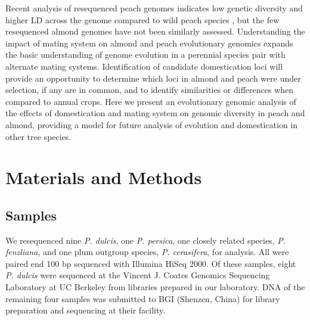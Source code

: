 \documentclass[12pt]{article}
\begin{document}
%
Recent analysis of resequenced peach genomes indicates low genetic diversity and higher LD across the genome compared to wild peach species \citep{verde2013high}, but the few resequenced almond genomes have not been similarly assessed. 
%
%
%
Understanding the impact of mating system on almond and peach evolutionary genomics expands the basic understanding of genome evolution in a perennial species pair with alternate mating systems. 
%
Identification of candidate domestication loci will provide an opportunity to determine which loci in almond and peach were under selection, if any are in common, and to identify similarities or differences when compared to annual crops. 
Here we present an evolutionary genomic analysis of the effects of domestication and mating system on genomic diversity in peach and almond, providing a model for  future analysis of evolution and domestication in other tree species.
%
\\
\section*{Materials and Methods}
%
\subsection*{Samples}
We resequenced nine \emph{P. dulcis}, one \emph{P. persica}, one closely related species, \emph{P. fenzliana}, and one plum outgroup species, \emph{P. cerasifera}, for analysis.
%
All were paired end 100 bp sequenced with Illumina HiSeq 2000. 
%
Of these samples, eight \emph{P. dulcis} were sequenced at the Vincent J. Coates Genomics Sequencing Laboratory at UC Berkeley from libraries prepared in our laboratory. 
%
DNA of the remaining four samples was submitted to BGI (Shenzen, China) 
for library preparation and sequencing at their facility.
%
\end{document}
